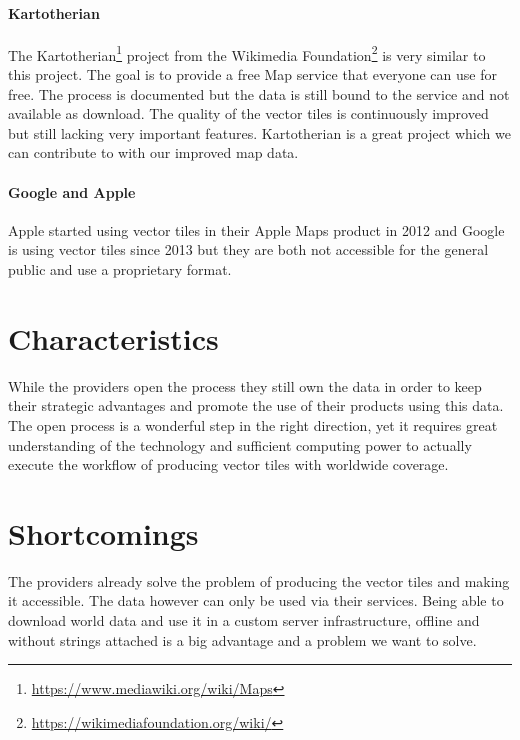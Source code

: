 \paragraph{Kartotherian}

The Kartotherian\footnote{\url{https://www.mediawiki.org/wiki/Maps}} project from the Wikimedia Foundation\footnote{\url{https://wikimediafoundation.org/wiki/}} is very similar to this project.
The goal is to provide a free Map service that everyone can use for free.
The process is documented but the data is still bound to the service and not available as download.
The quality of the vector tiles is continuously improved but still lacking very important features.
Kartotherian is a great project which we can contribute to with our improved map data.

\paragraph{Google and Apple}

Apple started using vector tiles in their Apple Maps product in 2012\cite{wiki:apple-maps}  and  Google is using vector tiles since 2013\cite{wiki:google-maps} but they are both not accessible for the general public and use a proprietary format. 

\section{Characteristics}

While the providers open the process they still own the data in order to keep their strategic advantages and promote the use of their products using this data.
The open process is a wonderful step in the right direction, yet it requires great understanding
of the technology and sufficient computing power to actually
execute the workflow of producing vector tiles with worldwide coverage.

\section{Shortcomings}

The providers already solve the problem of producing the vector tiles
and making it accessible. The data however can only be used
via their services.
\newline{}
Being able to download world data and use it in a custom server
infrastructure, offline and without strings attached is a big advantage
and a problem we want to solve.

\newpage
